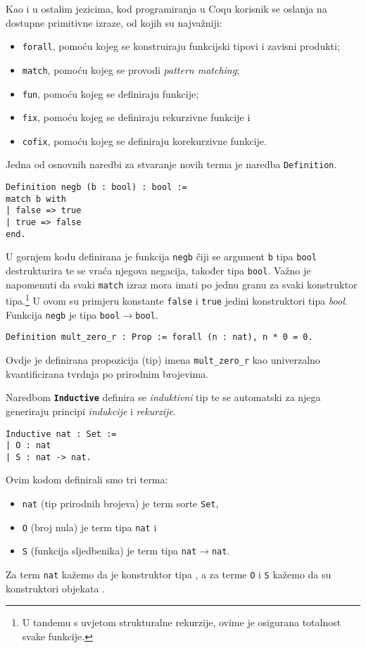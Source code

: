 Kao i u ostalim jezicima, kod programiranja u Coqu korisnik se oslanja na dostupne primitivne izraze,
od kojih su najvažniji:
\begin{itemize}
\item \texttt{forall}, pomoću kojeg se konstruiraju funkcijski tipovi i zavisni produkti;
\item \texttt{match}, pomoću kojeg se provodi \textit{pattern matching};
\item \texttt{fun}, pomoću kojeg se definiraju funkcije;
\item \texttt{fix}, pomoću kojeg se definiraju rekurzivne funkcije i
\item \texttt{cofix}, pomoću kojeg se definiraju korekurzivne funkcije.
\end{itemize}

Jedna od osnovnih naredbi za stvaranje novih terma je naredba \texttt{Definition}.
\begin{verbatim}
Definition negb (b : bool) : bool :=
match b with
| false => true
| true => false
end.
\end{verbatim}
\noindent U gornjem kodu definirana je funkcija \texttt{negb} čiji se argument \texttt{b} tipa \texttt{bool} destrukturira te se vraća njegova negacija, također tipa \texttt{bool}.
Važno je napomenuti da svaki \texttt{match} izraz mora imati po jednu granu za svaki konstruktor tipa.\footnote{U tandemu s uvjetom strukturalne rekurzije, ovime je osigurana totalnost svake funkcije.}
U ovom su primjeru konstante \texttt{false} i \texttt{true} jedini konstruktori tipa \textit{bool}.
Funkcija \texttt{negb} je tipa \texttt{bool\(\rightarrow\)bool}.
\begin{verbatim}
Definition mult_zero_r : Prop := forall (n : nat), n * 0 = 0.
\end{verbatim}
Ovdje je definirana propozicija (tip) imena \texttt{mult\_zero\_r} kao univerzalno kvantificirana tvrdnja po prirodnim brojevima.

Naredbom \texttt{\textbf{Inductive}} definira se \textit{induktivni} tip te se automatski za njega generiraju principi \textit{indukcije} i \textit{rekurzije}.
\begin{verbatim}
Inductive nat : Set :=
| O : nat
| S : nat -> nat.
\end{verbatim}
Ovim kodom definirali smo tri terma:
\begin{itemize}
\item \texttt{nat} (tip prirodnih brojeva) je term sorte \texttt{Set},
\item \texttt{O} (broj nula) je term tipa \texttt{nat} i
\item \texttt{S} (funkcija sljedbenika) je term tipa \texttt{nat\(\rightarrow\)nat}.
\end{itemize}
\noindent Za term \texttt{nat} kažemo da je konstruktor tipa , a za terme \texttt{O} i \texttt{S} kažemo da su konstruktori objekata .

